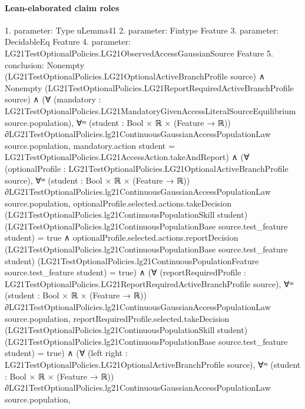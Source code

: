 \documentclass[10pt]{article}
\begin{document}
\paragraph{Lean-elaborated claim roles}\begin{ReviewVerbatim}
1. parameter: Type uLemma41
2. parameter: Fintype Feature
3. parameter: DecidableEq Feature
4. parameter: LG21TestOptionalPolicies.LG21ObservedAccessGaussianSource Feature
5. conclusion: Nonempty (LG21TestOptionalPolicies.LG21OptionalActiveBranchProfile source) ∧
  Nonempty (LG21TestOptionalPolicies.LG21ReportRequiredActiveBranchProfile source) ∧
    (∀ (mandatory : LG21TestOptionalPolicies.LG21MandatoryGivenAccessLiteralSourceEquilibrium source.population),
        ∀ᵐ (student :
          Bool ×
            ℝ × (Feature → ℝ)) ∂LG21TestOptionalPolicies.lg21ContinuousGaussianAccessPopulationLaw source.population,
          mandatory.action student = LG21TestOptionalPolicies.LG21AccessAction.takeAndReport) ∧
      (∀ (optionalProfile : LG21TestOptionalPolicies.LG21OptionalActiveBranchProfile source),
          ∀ᵐ (student :
            Bool ×
              ℝ × (Feature → ℝ)) ∂LG21TestOptionalPolicies.lg21ContinuousGaussianAccessPopulationLaw source.population,
            optionalProfile.selected.actions.takeDecision
                  (LG21TestOptionalPolicies.lg21ContinuousPopulationSkill student)
                  (LG21TestOptionalPolicies.lg21ContinuousPopulationBase source.test_feature student) =
                true ∧
              optionalProfile.selected.actions.reportDecision
                  (LG21TestOptionalPolicies.lg21ContinuousPopulationBase source.test_feature student)
                  (LG21TestOptionalPolicies.lg21ContinuousPopulationFeature source.test_feature student) =
                true) ∧
        (∀ (reportRequiredProfile : LG21TestOptionalPolicies.LG21ReportRequiredActiveBranchProfile source),
            ∀ᵐ (student :
              Bool ×
                ℝ ×
                  (Feature → ℝ)) ∂LG21TestOptionalPolicies.lg21ContinuousGaussianAccessPopulationLaw source.population,
              reportRequiredProfile.selected.takeDecision
                  (LG21TestOptionalPolicies.lg21ContinuousPopulationSkill student)
                  (LG21TestOptionalPolicies.lg21ContinuousPopulationBase source.test_feature student) =
                true) ∧
          (∀ (left right : LG21TestOptionalPolicies.LG21OptionalActiveBranchProfile source),
              ∀ᵐ (student :
                Bool ×
                  ℝ ×
                    (Feature →
                      ℝ)) ∂LG21TestOptionalPolicies.lg21ContinuousGaussianAccessPopulationLaw source.population,

\end{ReviewVerbatim}
\end{document}
